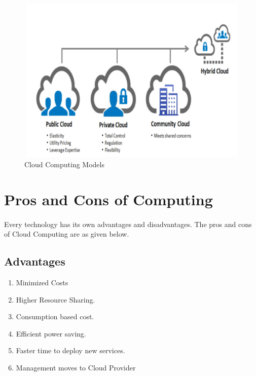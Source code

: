 \begin{figure}[htb]
\centering
\includegraphics[width=12cm,height=8cm]{5-contents/1-Introduction/images/cloud-computing-model.png} %
\caption{Cloud Computing Models}
\label{fig:label} %
\end{figure}

\section{Pros and Cons of Computing}
\paragraph{\hspace{24pt}}
Every technology has its own advantages and disadvantages. The pros and cons of Cloud Computing are as given below.

\subsection{Advantages}
\begin{enumerate}
    \item Minimized Costs
    \item Higher Resource Sharing.
    \item Consumption based cost.
    \item Efficient power saving.
    \item Faster time to deploy new services.
    \item Management moves to Cloud Provider
\end{enumerate}

